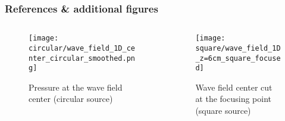 \documentclass[UKenglish,8pt,aspectratio=1610]{beamer}
\begin{document}
\begin{frame}
	\frametitle{References \& additional figures}
		\begin{columns}
		
		\begin{column}{0.5\textwidth}
			\vspace{-15pt}
			\begin{figure}[h!]
			\centering
			\texttt{[image: circular/wave\_field\_1D\_center\_circular\_smoothed.png]}
			\caption{Pressure at the wave field center (circular source)}
		\end{figure}
		\end{column}
		
		\begin{column}{0.5\textwidth}
			\vspace{-15pt}
			\begin{figure}[h!]
				\centering
				\texttt{[image: square/wave\_field\_1D\_z=6cm\_square\_focused]}
				\caption{Wave field center cut at the focusing point (square source)}
			\end{figure}
		\end{column}
	\end{columns}
	\printbibliography
\end{frame}
\end{document}
